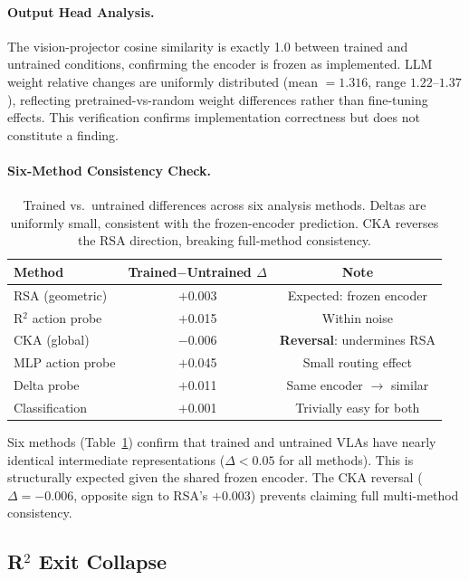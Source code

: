 \documentclass[letterpaper]{article}
\begin{document}
\paragraph{Output Head Analysis.}
The vision-projector cosine similarity is exactly 1.0 between trained and untrained conditions, confirming the encoder is frozen as implemented. LLM weight relative changes are uniformly distributed (mean $= 1.316$, range $1.22$--$1.37$), reflecting pretrained-vs-random weight differences rather than fine-tuning effects. This verification confirms implementation correctness but does not constitute a finding.

\paragraph{Six-Method Consistency Check.}

\begin{table}[h]
\centering
\caption{Trained vs.\ untrained differences across six analysis methods. Deltas are uniformly small, consistent with the frozen-encoder prediction. CKA reverses the RSA direction, breaking full-method consistency.}
\label{tab:six_methods}
\begin{tabular}{lcc}
\toprule
Method & Trained$-$Untrained $\Delta$ & Note \\
\midrule
RSA (geometric) & $+$0.003 & Expected: frozen encoder \\
R$^2$ action probe & $+$0.015 & Within noise \\
CKA (global) & $-$0.006 & \textbf{Reversal}: undermines RSA \\
MLP action probe & $+$0.045 & Small routing effect \\
Delta probe & $+$0.011 & Same encoder $\to$ similar \\
Classification & $+$0.001 & Trivially easy for both \\
\bottomrule
\end{tabular}
\end{table}

Six methods (Table~\ref{tab:six_methods}) confirm that trained and untrained VLAs have nearly identical intermediate representations ($\Delta < 0.05$ for all methods). This is structurally expected given the shared frozen encoder. The CKA reversal ($\Delta = -0.006$, opposite sign to RSA's $+0.003$) prevents claiming full multi-method consistency.

\subsection{R$^2$ Exit Collapse}
\label{sec:exit_collapse}
\end{document}
